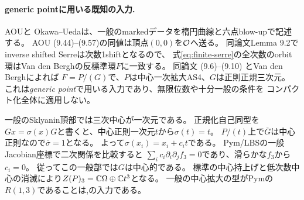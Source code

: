 \paragraph{generic pointに用いる既知の入力.}
AOU\cite[Theorem 1.1, \S9, Theorem 9.4]{AOU}と
Okawa--Ueda\cite[Theorem 6.4]{OU2025}は、一般のmarkedデータを楕円曲線と六点blow-upで記述する。
AOU (9.44)--(9.57)の同値は頂点$(0,0)$を$\mathcal O$へ送る。
同論文Lemma 9.2でinverse shifted Serreは次数1shiftとなるので、
式\eqref{eq:finite-serre}の全次数のorbit環はVan den Berghの反標準環$F$に一致する。
同論文 (9.6)--(9.10) とVan den Bergh\cite[Chapter 12]{VdB}によれば
$F=P/(G)$で、$P$は中心一次拡大AS4、$G$は正則正規三次元。
これは\emph{generic point}で用いる入力であり、無限位数や十分一般の条件を
コンパクト化全体に適用しない。

一般のSklyanin頂部では三次中心が一次元である。
正規化自己同型を$Gx=\sigma(x)G$と書くと、中心正則一次元$t$から$\sigma(t)=t$。
$P/(t)$上で$\overline G$は中心正則なので$\overline\sigma=1$となる。
よって$\sigma(x_i)=x_i+c_i t$である。
Pym/LBSの一般Jacobian座標で二次関係を比較すると
$\sum_i c_i\partial_i\partial_j f_3=0$であり、滑らかな$f_3$から$c_i=0$。
従ってこの一般部では$G$は中心的である。
標準の中心持上げと低次数中心の消滅により$Z(P)_3=\mathbb C\Omega\oplus\mathbb C t^3$となる。
一般の中心拡大の型がPymの$R(1,3)$であることは\cite[\S3.4]{Pym},\cite{LBS}の入力である。

